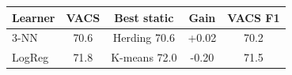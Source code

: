 \begin{tabular}{lcccc}
\toprule
Learner & VACS & Best static & Gain & VACS F1 \\
\midrule
3-NN & 70.6 & Herding 70.6 & +0.02 & 70.2 \\
LogReg & 71.8 & K-means 72.0 & -0.20 & 71.5 \\
\bottomrule
\end{tabular}
